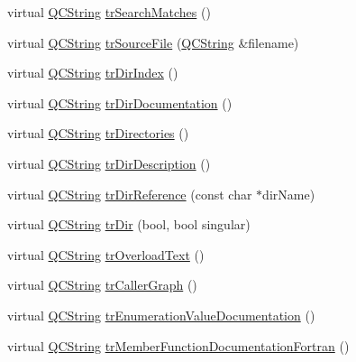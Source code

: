 \begin{DoxyCompactItemize}
\item 
virtual \mbox{\hyperlink{class_q_c_string}{Q\+C\+String}} \mbox{\hyperlink{class_translator_german_ad5471f4edf26ef3f7066cc3eba448b6d}{tr\+Search\+Matches}} ()
\item 
virtual \mbox{\hyperlink{class_q_c_string}{Q\+C\+String}} \mbox{\hyperlink{class_translator_german_a705bf582f775888df4a792c333718abf}{tr\+Source\+File}} (\mbox{\hyperlink{class_q_c_string}{Q\+C\+String}} \&filename)
\item 
virtual \mbox{\hyperlink{class_q_c_string}{Q\+C\+String}} \mbox{\hyperlink{class_translator_german_a2d33bc79fb65d698807ea46532d50551}{tr\+Dir\+Index}} ()
\item 
virtual \mbox{\hyperlink{class_q_c_string}{Q\+C\+String}} \mbox{\hyperlink{class_translator_german_a7e5726b5c6331a54de31316e61ebf9fe}{tr\+Dir\+Documentation}} ()
\item 
virtual \mbox{\hyperlink{class_q_c_string}{Q\+C\+String}} \mbox{\hyperlink{class_translator_german_a42df8de10bf821b0372b4061919c73fc}{tr\+Directories}} ()
\item 
virtual \mbox{\hyperlink{class_q_c_string}{Q\+C\+String}} \mbox{\hyperlink{class_translator_german_a33eef9cc312569c52faebe8c88a30973}{tr\+Dir\+Description}} ()
\item 
virtual \mbox{\hyperlink{class_q_c_string}{Q\+C\+String}} \mbox{\hyperlink{class_translator_german_af052928213c7388e1f63f40d536507c0}{tr\+Dir\+Reference}} (const char $\ast$dir\+Name)
\item 
virtual \mbox{\hyperlink{class_q_c_string}{Q\+C\+String}} \mbox{\hyperlink{class_translator_german_ab6d10fdf35b3ba3de9aeefa8544f00a8}{tr\+Dir}} (bool, bool singular)
\item 
virtual \mbox{\hyperlink{class_q_c_string}{Q\+C\+String}} \mbox{\hyperlink{class_translator_german_aeef7e1abd5dd7f5dc69d9e32f0c3b109}{tr\+Overload\+Text}} ()
\item 
virtual \mbox{\hyperlink{class_q_c_string}{Q\+C\+String}} \mbox{\hyperlink{class_translator_german_a67e49f4354c664aa49f700c02db17838}{tr\+Caller\+Graph}} ()
\item 
virtual \mbox{\hyperlink{class_q_c_string}{Q\+C\+String}} \mbox{\hyperlink{class_translator_german_a085a9273d752197639c39b41f97c3447}{tr\+Enumeration\+Value\+Documentation}} ()
\item 
virtual \mbox{\hyperlink{class_q_c_string}{Q\+C\+String}} \mbox{\hyperlink{class_translator_german_a5aba68025b2a7fb7eda6667c5b4d6064}{tr\+Member\+Function\+Documentation\+Fortran}} ()
\item 

\end{DoxyCompactItemize}
